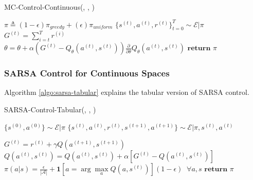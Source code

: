 \documentclass[11pt]{article}
\begin{document}
\begin{algorithm}[H]
\caption{MC-Control-Continuous(\pi, \epsilon, \alpha)}
\label{algo:mc-continuous}
\begin{algorithmic}[1]
\vspace{0.15cm}
\STATE $\pi \triangleq (1-\epsilon) \pi_{greedy} + (\epsilon)  \pi_{uniform}$
\vspace{0.15cm}
\STATE $\{s^{(t)}, a^{(t)}, r^{(t)}\}_{t=0}^T \sim \mathcal{E}|\pi$
\vspace{0.15cm}
\STATE $G^{(t)} = \sum\limits_{i=t}^T r^{(i)}$\\
\vspace{0.15cm}
\STATE $\theta = \theta + \alpha \left( G^{(t)} - Q_{\theta}(a^{(t)}, s^{(t)})\right)\frac{\partial}{\partial \theta}Q_{\theta}(a^{(t)}, s^{(t)})$
\ENDFOR
\ENDFOR
\STATE $\textbf{return } \pi$
\end{algorithmic}
\end{algorithm}

\subsubsection{SARSA Control for Continuous Spaces}

Algorithm \ref{algo:sarsa-tabular} explains the tabular version of SARSA control.

\begin{algorithm}[H]
\caption{SARSA-Control-Tabular(\pi, \epsilon, \alpha)}
\label{algo:sarsa-tabular}
\begin{algorithmic}[1]
\vspace{0.15cm}
\STATE $\{s^{(0)}, a^{(0)}\} \sim \mathcal{E}|\pi$
\vspace{0.15cm}
\vspace{0.15cm}
\STATE $\{s^{(t)}, a^{(t)}, r^{(t)}, s^{(t+1)}, a^{(t+1)}\} \sim \mathcal{E}|\pi, s^{(t)}, a^{(t)}$
\vspace{0.15cm}

\STATE $G^{(t)} = r^{(t)} + \gamma Q(a^{(t+1)}, s^{(t+1)})$\\
\vspace{0.15cm}
\STATE $Q(a^{(t)}, s^{(t)}) = Q(a^{(t)}, s^{(t)}) + \alpha\left[ G^{(t)} - Q(a^{(t)}, s^{(t)})\right]$\\
\vspace{0.15cm}
\STATE $\pi(a|s) = \frac{\epsilon}{|\mathcal{A}|} + \mathbf{1}\left[ a = \arg \max\limits_a Q(a, s^{(t)})\right] (1-\epsilon)\;\; \forall a, s$
\vspace{0.15cm}
\ENDFOR
\ENDFOR
\STATE $\textbf{return } \pi$
\end{algorithmic}
\end{algorithm}
\end{document}
